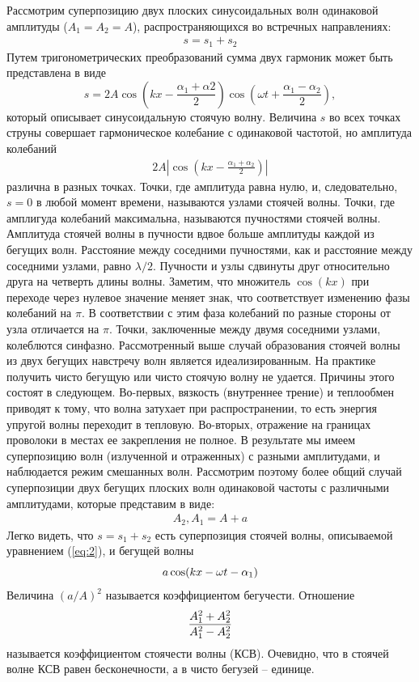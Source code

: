 Рассмотрим суперпозицию двух плоских синусоидальных волн одинаковой амплитуды ($A_1=A_2=A$), распространяющихся во встречных направлениях:
\begin{gather*}
	s=s_1+s_2
\end{gather*}
Путем тригонометрических преобразований сумма двух гармоник может быть представлена в виде
\begin{equation}
\label{eq:2}
	s=2A\cos\left(kx-\frac{\alpha_1+\alpha2}{2}\right)\cos\left(\omega t+\frac{\alpha_1-\alpha_2}{2}\right),
\end{equation}
который описывает синусоидальную стоячую волну. Величина $s$ во всех точках струны совершает гармоническое колебание с одинаковой частотой, но амплитуда колебаний
\begin{gather*}
	2A\left|\cos\left(kx-\frac{\alpha_1+\alpha_2}{2} \right) \right|
\end{gather*}
различна в разных точках. Точки, где амплитуда равна нулю, и, следовательно, $s=0$ в любой момент времени, называются узлами стоячей волны. Точки, где амплигуда колебаний максимальна, называются пучностями стоячей волны.
 Амплитуда стоячей волны в пучности вдвое больше амплитуды каждой из бегущих волн. Расстояние между соседними пучностями, как и расстояние между соседними узлами, равно $\lambda/2$. Пучности и узлы сдвинуты друг относительно друга на четверть длины
волны.
Заметим, что множитель $\cos(kx)$ при переходе через нулевое значение меняет
знак, что соответствует изменению фазы колебаний на $\pi$. В соответствии с этим фаза колебаний по разные стороны от узла отличается на $\pi$. Точки, заключенные между двумя соседними узлами, колеблются синфазно.
Рассмотренный выше случай образования стоячей волны из двух бегущих навстречу волн является идеализированным. На практике получить чисто бегущую или чисто стоячую волну не удается. Причины этого состоят в следующем. Во-первых, вязкость (внутреннее трение) и теплообмен приводят к тому, что волна затухает при распространении, то есть энергия упругой волны переходит в тепловую. Во-вторых, отражение на границах проволоки в местах ее закрепления не полное. В результате мы имеем суперпозицию волн (излученной и отраженных) с разными амплитудами, и наблюдается режим смешанных волн. Рассмотрим поэтому более общий случай суперпозиции двух бегущих плоских волн одинаковой частоты с различными амплитудами, которые представим в виде:
\begin{gather*}
	A_2, A_1=A+a
\end{gather*}
Легко видеть, что $s=s_1+s_2$ есть суперпозиция стоячей волны, описываемой уравнением (\ref{eq:2}),  и бегущей волны
\begin{equation}
	a\cos(kx-\omega t-\alpha_1) \notag
\end{equation}
Величина $(a/A)^2$ называется коэффициентом бегучести. Отношение
\begin{equation}
	\frac{A_1^2+A_2^2}{A_1^2-A_2^2} \notag
\end{equation}
называется коэффициентом стоячести волны (КСВ). Очевидно, что в стоячей волне КСВ равен бесконечности, а в чисто бегузей -- единице.


